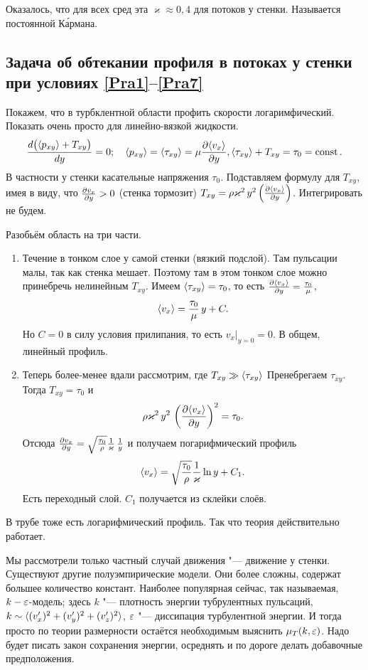 Оказалось, что для всех сред эта $\varkappa\approx0{,}4$ для потоков у стенки. Называется постоянной К\'{а}рмана.

\subsection{Задача об обтекании профиля в потоках у стенки при условиях \eqref{Pra1}--\eqref{Pra7}}
Покажем, что в турбклентной области профить скорости логаримфический. Показать очень просто для линейно-вязкой жидкости.
\[
  \frac{d\big(\langle p_{xy} \rangle+T_{xy}\big)}{dy}=0;\quad \langle p_{xy} \rangle = \langle \tau_{xy} \rangle = \mu\frac{\partial \langle v_x \rangle}{\partial y}, 
\langle \tau_{xy} \rangle + T_{xy} = \tau_0 = \operatorname{const}.
\]
В частности у стенки касательные напряжения $\tau_0$. Подставляем формулу для $T_{xy}$, имея в виду, что $\frac{\partial v_x}{\partial y}>0$ (стенка тормозит) $T_{xy} = \rho\varkappa^2\,y^2\left(\frac{\partial \langle v_x \rangle}{\partial y}\right)$. Интегрировать не будем.

Разобьём область на три части.
\begin{enumerate}
\item Течение в тонком слое у самой стенки (вязкий подслой). Там пульсации малы, так как стенка мешает. Поэтому там в этом тонком слое можно принебречь нелинейным $T_{xy}$. Имеем $\langle \tau_{xy} \rangle = \tau_0$, то есть $\frac{\partial \langle v_x \rangle}{\partial y} = \frac{\tau_0}\mu$,
\[
  \langle v_x \rangle = \frac{\tau_0}\mu\,y+ C.
\]
Но $C=0$ в силу условия прилипания, то есть $v_x|_{y=0}=0$. В общем, линейный профиль.
\item Теперь более-менее вдали рассмотрим, где $T_{xy}\gg\langle \tau_{xy} \rangle$ Пренебрегаем $\tau_{xy}$. Тогда $T_{xy} = \tau_0$ и
\[
  \rho\varkappa^2\,y^2\,\left(\frac{\partial \langle v_x \rangle}{\partial y}\right)^2 = \tau_0.
\]
Отсюда $\frac{\partial v_x}{\partial y} = \sqrt{\frac{\tau_0}\rho}\frac1\varkappa\,\frac1y$ и получаем погарифмический профиль
\[
  \langle v_x \rangle = \sqrt{\frac{\tau_0}\rho}\frac1\varkappa \ln y + C_1.
\]
Есть переходный слой. $C_1$ получается из склейки слоёв.
\end{enumerate}
В трубе тоже есть логарифмический профиль. Так что теория действительно работает.

Мы рассмотрели только частный случай движения "--- движение у стенки. Существуют другие полуэмпирические модели. Они более сложны, содержат большее количество констант. Наиболее популярная сейчас, так называемая, $k-\varepsilon$-модель; здесь $k$ "--- плотность энергии тубрулентных пульсаций, $k\sim\langle (v'_x)^2+(v'_y)^2+(v'_z)^2 \rangle$, $\varepsilon$ "--- диссипация турбулентной энергии. И тогда просто по теории размерности остаётся необходимым выяснить $\mu_T(k,\varepsilon)$. Надо будет писать закон сохранения энергии, осреднять и по дороге делать добавочные предположения.
